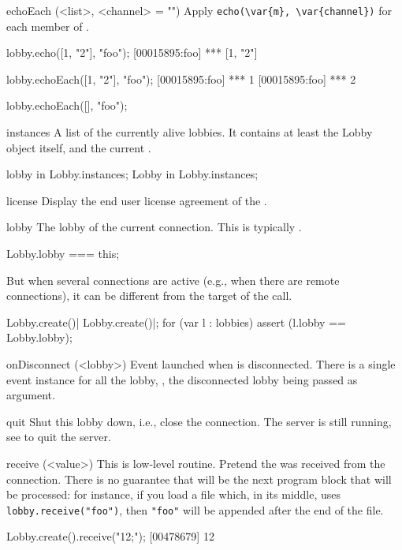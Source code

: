 \begin{urbiscriptapi}
\item[echoEach](<list>, <channel> = "")%
  Apply \lstinline|echo(\var{m}, \var{channel})| for each member  of
  .
\begin{urbiscript}
lobby.echo([1, "2"], "foo");
[00015895:foo] *** [1, "2"]

lobby.echoEach([1, "2"], "foo");
[00015895:foo] *** 1
[00015895:foo] *** 2

lobby.echoEach([], "foo");
\end{urbiscript}




\item[instances]
  A list of the currently alive lobbies.  It contains at least the Lobby
  object itself, and the current .
\begin{urbiassert}
lobby in Lobby.instances;
Lobby in Lobby.instances;
\end{urbiassert}


\item[license]
  Display the end user license agreement of the \usdk.

\item[lobby]
  The lobby of the current connection.  This is typically \this.
\begin{urbiassert}
Lobby.lobby === this;
\end{urbiassert}

  But when several connections are active (e.g., when there are remote
  connections), it can be different from the target of the call.

\begin{urbiscript}
Lobby.create()| Lobby.create()|;
for (var l : lobbies)
  assert (l.lobby == Lobby.lobby);
\end{urbiscript}


\item[onDisconnect](<lobby>)%
  Event launched when \this is disconnected.  There is a single event
  instance for all the lobby, , the
  disconnected lobby being passed as argument.


\item[quit] Shut this lobby down, i.e., close the connection.  The
  server is still running, see  to quit the
  server.


\item[receive](<value>)%
  This is low-level routine.  Pretend the 
   was received from the connection.  There is no guarantee
  that  will be the next program block that will be
  processed: for instance, if you load a file which, in its middle,
  uses \lstinline|lobby.receive("foo")|, then \lstinline|"foo"| will
  be appended after the end of the file.
\begin{urbiscript}
Lobby.create().receive("12;");
[00478679] 12
\end{urbiscript}



\end{urbiscriptapi}
